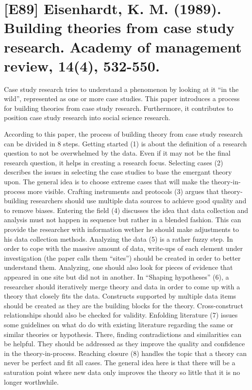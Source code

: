 \documentclass[a4paper,12pt,english]{scrartcl}
\newcommand{\papertitle}[2]{
	\section{[#1] #2}
}
\begin{document}
\pagestyle{fancy} %

\papertitle{E89}{Eisenhardt, K. M. (1989). Building theories from case study research. Academy of management review, 14(4), 532-550.}

Case study research tries to understand a phenomenon by looking at it \enquote{in the wild}, represented as one or more case studies. This paper introduces a process for building theories from case study research. Furthermore, it contributes to position case study research into social science research.

According to this paper, the process of building theory from case study research can be divided in 8 steps. Getting started (1) is about the definition of a research question to not be overwhelmed by the data. Even if it may not be the final research question, it helps in creating a research focus. Selecting cases (2) describes the issues in selecting the case studies to base the emergant theory upon. The general idea is to choose extreme cases that will make the theory-in-process more visible. Crafting instruments and protocols (3) argues that theory-building researchers should use multiple data sources to achieve good quality and to remove biases. Entering the field (4) discusses the idea that data collection and analysis must not happen in sequence but rather in a blended fashion. This can provide the researcher with information wether he should make adjustments to his data collection methods. Analyzing the data (5) is a rather fuzzy step. In order to cope with the massive amount of data, write-ups of each element under investigation (the paper calls them \enquote{sites}) should be created in order to better understand them. Analyzing, one should also look for pieces of evidence that appeared in one site but did not in another. In \enquote{Shaping hypotheses} (6), a researcher should iteratively merge theory and data in order to come up with a theory that closely fits the data. Constructs supported by multiple data items should be created as they are the building blocks for the theory. Cross-construct relationships should also be checked for validity. Enfolding literature (7) issues some guidelines on what do do with existing literature regarding the same or similar theories or hypothesis. There, finding contradictions and similarities can be helpful. They should be addressed as they improve the quality and confidence in the theory-in-process. Reaching closure (8) handles the topic that a theory can never be perfect and fit all cases. The general idea here is that there will be a saturation point where new data only improves the theory so little that it is no longer worthwhile.
\end{document}
